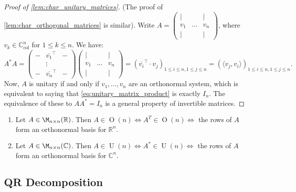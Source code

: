 \begin{proof}[Proof of \cref{lem:char_unitary_matrices}]
(The proof of \cref{lem:char_orthogonal_matrices} is similar).
Write $A = \begin{pmatrix} | & & | \\ v_1 & \dots & v_n \\ | & & | \end{pmatrix}$, where $v_k \in \mathbb{C}_{\text{col}}^n$ for $1 \leq k \leq n$. We have:
\begin{equation}
\label{eq:unitary_matrix_product}
A^* A = \begin{pmatrix} - & \overline{v_1}^\top & - \\ & \vdots & \\ - & \overline{v_n}^\top & - \end{pmatrix} \begin{pmatrix} | & & | \\ v_1 & \dots & v_n \\ | & & | \end{pmatrix} = \left( \overline{v_i}^\top \cdot v_j \right)_{1 \leq i \leq n, 1 \leq j \leq n} = \left( \langle v_j, v_i \rangle \right)_{1 \leq i \leq n, 1 \leq j \leq n}.
\end{equation}
Now, $A$ is unitary if and only if $v_1, \dots, v_n$ are an orthonormal system, which is equivalent to saying that \eqref{eq:unitary_matrix_product} is exactly $I_n$. The equivalence of these to $A A^* = I_n$ is a general property of invertible matrices.
\end{proof}

\begin{corollary}
\label{cor:rows_orthogonal_unitary}
\begin{enumerate}
    \item Let $A \in \M_{n \times n}(\mathbb{R})$. Then $A \in \operatorname{O}(n) \iff A^T \in \operatorname{O}(n) \iff$ the rows of $A$ form an orthonormal basis for $\mathbb{R}^n$.
    \item Let $A \in \M_{n \times n}(\mathbb{C})$. Then $A \in \operatorname{U}(n) \iff A^* \in \operatorname{U}(n) \iff$ the rows of $A$ form an orthonormal basis for $\mathbb{C}^n$.
\end{enumerate}
\end{corollary}

\subsection{QR Decomposition}

